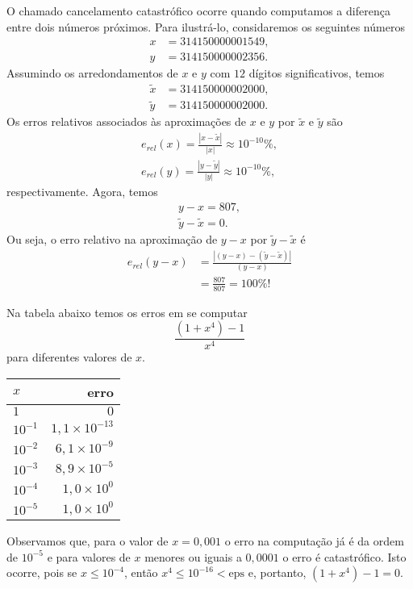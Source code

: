 O chamado cancelamento catastrófico ocorre quando computamos a diferença entre dois números próximos. Para ilustrá-lo, considaremos os seguintes números
\begin{align}
  x &= 314150000001549,\\
  y &= 314150000002356.
\end{align}
Assumindo os arredondamentos de $x$ e $y$ com $12$ dígitos significativos, temos
\begin{align}
  \tilde{x} &= 314150000002000,\\
  \tilde{y} &= 314150000002000.
\end{align}
Os erros relativos associados às aproximações de $x$ e $y$ por $\tilde{x}$ e $\tilde{y}$ são
\begin{gather}
  e_{rel}(x) = \frac{|x-\tilde{x}|}{|x|} \approx 10^{-10}\%,\\
  e_{rel}(y) = \frac{|y-\tilde{y}|}{|y|} \approx 10^{-10}\%,
\end{gather}
respectivamente. Agora, temos
\begin{gather}
  y-x = 807,\\
  \tilde{y}-\tilde{x}=0.
\end{gather}
Ou seja, o erro relativo na aproximação de $y-x$ por $\tilde{y}-\tilde{x}$ é
\begin{align}
  e_{rel}(y-x) &= \frac{|(y-x)-(\tilde{y}-\tilde{x})|}{(y-x)}\\
               &= \frac{807}{807} = 100\%!
\end{align}

\begin{ex}\label{ex:cancela_1}
  Na tabela abaixo temos os erros em se computar
  \begin{equation}
    \frac{(1+x^4)-1}{x^4}
  \end{equation}
  para diferentes valores de $x$.
  
  \begin{center}
    \begin{tabular}{l|r}
      $x$     & erro \\\hline
      $1$      & $0$ \\
      $10^{-1}$ & $1,1\times 10^{-13}$\\
      $10^{-2}$ & $6,1\times 10^{-9}$\\
      $10^{-3}$ & $8,9\times 10^{-5}$\\
      $10^{-4}$ & $1,0\times 10^{0}$\\
      $10^{-5}$ & $1,0\times 10^{0}$\\\hline
    \end{tabular}
  \end{center}
  Observamos que, para o valor de $x=0,001$ o erro na computação já é da ordem de $10^{-5}$ e para valores de $x$ menores ou iguais a $0,0001$ o erro é catastrófico. Isto ocorre, pois se $x\leq 10^{-4}$, então $x^4 \leq 10^{-16} < \mathrm{eps}$ e, portanto, $(1+x^4)-1=0$.
\end{ex}


